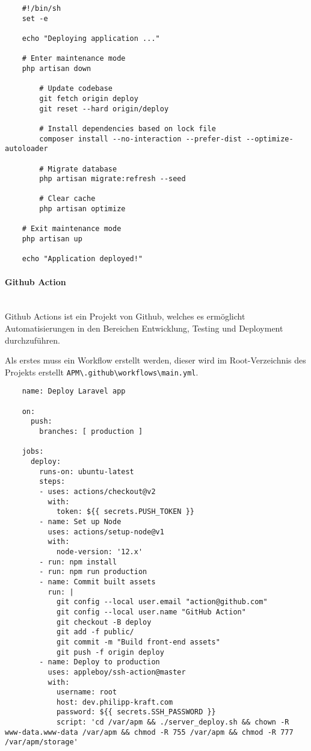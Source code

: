 \begin{longlisting}
  \begin{verbatim}
    #!/bin/sh
    set -e
    
    echo "Deploying application ..."
    
    # Enter maintenance mode
    php artisan down
        
        # Update codebase
        git fetch origin deploy
        git reset --hard origin/deploy
    
        # Install dependencies based on lock file
        composer install --no-interaction --prefer-dist --optimize-autoloader
    
        # Migrate database
        php artisan migrate:refresh --seed
    
        # Clear cache
        php artisan optimize
    
    # Exit maintenance mode
    php artisan up
    
    echo "Application deployed!"
  \end{verbatim}
  \caption{serverdeploy.sh}
\end{longlisting}


\paragraph{Github Action}\mbox{}\\
Github Actions ist ein Projekt von Github, welches es ermöglicht
Automatisierungen in den Bereichen Entwicklung, Testing und Deployment
durchzuführen.

Als erstes muss ein Workflow erstellt werden, dieser wird im Root-Verzeichnis
des Projekts erstellt \verb|APM\.github\workflows\main.yml|.

\begin{longlisting}
  \begin{verbatim}
    name: Deploy Laravel app

    on:
      push:
        branches: [ production ]
    
    jobs:
      deploy:
        runs-on: ubuntu-latest
        steps:
        - uses: actions/checkout@v2
          with:
            token: ${{ secrets.PUSH_TOKEN }}
        - name: Set up Node
          uses: actions/setup-node@v1
          with:
            node-version: '12.x'
        - run: npm install
        - run: npm run production
        - name: Commit built assets
          run: |
            git config --local user.email "action@github.com"
            git config --local user.name "GitHub Action"
            git checkout -B deploy
            git add -f public/
            git commit -m "Build front-end assets"
            git push -f origin deploy
        - name: Deploy to production
          uses: appleboy/ssh-action@master
          with:
            username: root
            host: dev.philipp-kraft.com
            password: ${{ secrets.SSH_PASSWORD }}
            script: 'cd /var/apm && ./server_deploy.sh && chown -R www-data.www-data /var/apm && chmod -R 755 /var/apm && chmod -R 777 /var/apm/storage' 
  \end{verbatim}
  \caption{main.yml}
\end{longlisting}

